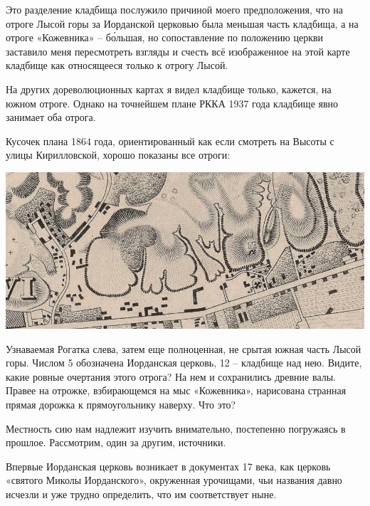 Это разделение кладбища послужило причиной моего предположения, что на отроге Лысой горы за Иорданской церковью была меньшая часть кладбища, а на отроге «Кожевника» – б\'ольшая, но сопоставление по положению церкви заставило меня пересмотреть взгляды и счесть всё изображенное на этой карте кладбище как относящееся только к отрогу Лысой. 

На других дореволюционных картах я видел кладбище только, кажется, на южном отроге. Однако на точнейшем плане РККА 1937 года кладбище явно занимает оба отрога.

Кусочек плана 1864 года, ориентированный как если смотреть на Высоты с улицы Кирилловской, хорошо показаны все отроги:

\begin{center}
\includegraphics[width=\linewidth]{chast-kirvys/lys02/1846-y.jpg}
\end{center}

Узнаваемая Рогатка слева, затем еще полноценная, не срытая южная часть Лысой горы. Числом 5 обозначена Иорданская церковь, 12 – кладбище над нею. Видите, какие ровные очертания этого отрога? На нем и сохранились древние валы. Правее на отрожке, взбирающемся на мыс «Кожевника», нарисована странная прямая дорожка к прямоугольнику наверху. Что это? 

Местность сию нам надлежит изучить внимательно, постепенно погружаясь в прошлое. Рассмотрим, один за другим, источники.

Впервые Иорданская церковь возникает в документах 17 века, как церковь «святого Миколы Иорданского», окруженная урочищами, чьи названия давно исчезли и уже трудно определить, что им соответствует ныне.

